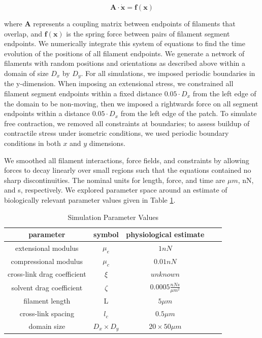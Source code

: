 \documentclass[10pt,letterpaper]{article}
\begin{document}
\begin{equation}
\mathbf{A \cdot \dot x} = \mathbf{f(x)}
\end{equation}

where $\mathbf{A }$ represents a coupling matrix between endpoints of filaments that overlap, and $\mathbf{f(x)}$ is the spring force between pairs of filament segment endpoints.   We numerically integrate this system of equations to find the time evolution of the positions of all filament endpoints. We generate a network of filaments with random positions and orientations as described above within a domain of size $D_x$ by $D_y$.  For all simulations, we imposed periodic boundaries in the y-dimension. When imposing an extensional stress, we constrained all filament segment endpoints within a fixed distance $0.05\cdot D_x$ from the left edge of the domain to be non-moving, then we imposed a rightwards force on all segment endpoints within a distance $0.05\cdot D_x$ from the left edge of the patch.   To simulate free contraction, we removed all constraints at boundaries; to assess buildup of contractile stress under isometric conditions, we used periodic boundary conditions in both $x$ and $y$ dimensions.




We smoothed all filament interactions, force fields, and constraints by allowing forces to decay linearly over small regions such that the equations contained no sharp discontinuities. The nominal units for length, force, and time are $\mu m$, nN, and s, respectively.  We explored parameter space around an estimate of biologically relevant parameter values given in Table \ref{table:para}. 

\begin{table}[h]
\centering
\caption{Simulation Parameter Values}
\label{table:para}
\begin{tabular}{|c|c|c|c|c|}
\hline
{\bf parameter}             & {\bf symbol} & {\bf physiological estimate}          \\ \hline
extensional modulus         & $\mu_e$        & $1 nN $                                               \\
compressional modulus             & $\mu_c$     & $ 0.01 nN $                           \\
cross-link drag coefficient & $\xi$      & $unknown $              \\
solvent drag coefficient     & $\zeta$        & $0.0005 \frac{nN s}{\mu m^2} $      \\
filament length             & L            & $5 \mu m$                                          \\
cross-link spacing          & $l_c$        & $0.5 \mu m$                                         \\
domain size                 & $D_x\times D_y$            & $20\times 50 \mu m$                                 \\ \hline
\end{tabular}
\end{table}
\end{document}
